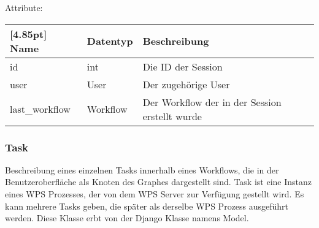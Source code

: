 		Attribute:
		\begin{center}
			\renewcommand{\arraystretch}{1.5}
			\setlength\tabcolsep{5pt}
			\begin{tabularx}{\textwidth}{|l|l|X|}
				\hline
				\rowcolor[gray]{0.75}[4.85pt]					
				Name & Datentyp & Beschreibung \\ \hline
				id & int & Die ID der Session \\ \hline
				user & User & Der zugehörige User \\ \hline
				last_workflow & Workflow & Der Workflow der in der Session erstellt wurde \\ \hline
			\end{tabularx}
		\end{center}

\newpage

		\subsubsection{Task}
			Beschreibung eines einzelnen Tasks innerhalb eines Workflows, die in der Benutzeroberfläche als Knoten des Graphes dargestellt sind. Task ist eine Instanz eines WPS Prozesses, der von dem WPS Server zur Verfügung gestellt wird. Es kann mehrere Tasks geben, die später als derselbe WPS Prozess ausgeführt werden. \newline
			Diese Klasse erbt von der Django Klasse namens \glqq Model\grqq .
			
